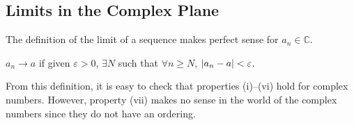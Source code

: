 \subsection{Limits in the Complex Plane}
\begin{remark}
	The definition of the limit of a sequence makes perfect sense for \(a_n \in \mathbb C\).
\end{remark}
\begin{definition}
	\(a_n \to a\) if given \(\varepsilon > 0\), \(\exists N\) such that \(\forall n \geq N\), \(\abs{a_n - a} < \varepsilon\).
\end{definition}
From this definition, it is easy to check that properties (i)--(vi) hold for complex numbers. %
However, property (vii) makes no sense in the world of the complex numbers since they do not have an ordering.
